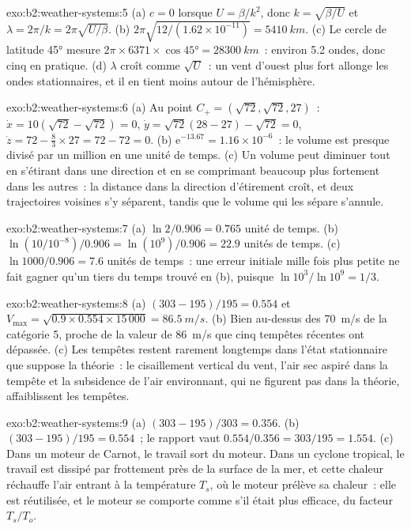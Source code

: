 \begin{solution}{exo:b2:weather-systems:5}
(a) $c = 0$ lorsque $U = \beta/k^2$, donc $k = \sqrt{\beta/U}$ et $\lambda = 2\pi/k =
2\pi\sqrt{U/\beta}$. (b) $2\pi\sqrt{12/(1.62 \times 10^{-11})} = \qty{5410}{km}$. (c) Le cercle
de latitude \ang{45} mesure $2\pi \times 6371 \times \cos\ang{45} = \qty{28300}{km}$~: environ 5.2
ondes, donc cinq en pratique. (d) $\lambda$ croît comme $\sqrt U$~: un vent d'ouest plus fort allonge les
ondes stationnaires, et il en tient moins autour de l'hémisphère.
\end{solution}

\begin{solution}{exo:b2:weather-systems:6}
(a) Au point $C_+ = (\sqrt{72}, \sqrt{72}, 27)$~: $\dot x = 10(\sqrt{72} - \sqrt{72}) = 0$, $\dot y =
\sqrt{72}(28 - 27) - \sqrt{72} = 0$, $\dot z = 72 - \tfrac83 \times 27 = 72 - 72 = 0$.
(b) $\mathrm{e}^{-13.67} = 1.16 \times 10^{-6}$~: le volume est presque divisé par un million en une unité de temps.
(c) Un volume peut diminuer tout en s'étirant dans une direction et en se comprimant beaucoup plus fortement dans les
autres~: la distance dans la direction d'étirement croît, et deux trajectoires voisines s'y séparent, tandis que le volume
qui les sépare s'annule.
\end{solution}

\begin{solution}{exo:b2:weather-systems:7}
(a) $\ln 2/0.906 = 0.765$ unité de temps. (b) $\ln(10/10^{-8})/0.906 = \ln(10^9)/0.906 = 22.9$ unités
de temps. (c) $\ln 1000/0.906 = 7.6$ unités de temps~: une erreur initiale mille fois plus petite ne
fait gagner qu'un tiers du temps trouvé en (b), puisque $\ln 10^3/\ln 10^9 = 1/3$.
\end{solution}

\begin{solution}{exo:b2:weather-systems:8}
(a) $(303 - 195)/195 = 0.554$ et $V_{\max} = \sqrt{0.9 \times 0.554 \times 15\,000} =
\qty{86.5}{m/s}$. (b) Bien au-dessus des \qty{70}{m/s} de la catégorie 5, proche de la valeur de \qty{86}{m/s} que
cinq tempêtes récentes ont dépassée. (c) Les tempêtes restent rarement longtemps dans l'état stationnaire que suppose la
théorie~: le cisaillement vertical du vent, l'air sec aspiré dans la tempête et la subsidence de l'air
environnant, qui ne figurent pas dans la théorie, affaiblissent les tempêtes.
\end{solution}

\begin{solution}{exo:b2:weather-systems:9}
(a) $(303 - 195)/303 = 0.356$. (b) $(303 - 195)/195 = 0.554$~; le rapport vaut $0.554/0.356 =
303/195 = 1.554$. (c) Dans un moteur de Carnot, le travail sort du moteur. Dans un cyclone tropical, le travail est
dissipé par frottement près de la surface de la mer, et cette chaleur réchauffe l'air entrant à la
température $T_s$, où le moteur prélève sa chaleur~: elle est réutilisée, et le moteur
se comporte comme s'il était plus efficace, du facteur $T_s/T_o$.
\end{solution}

